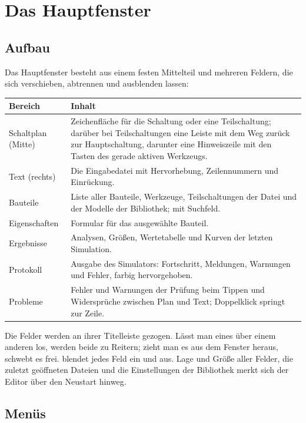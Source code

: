 \chapter{Das Hauptfenster}
\label{kap:editor-fenster}

\section{Aufbau}

Das Hauptfenster besteht aus einem festen Mittelteil und mehreren Feldern,
die sich verschieben, abtrennen und ausblenden lassen:

\begin{center}
\begin{tabularx}{\textwidth}{@{}lL@{}}
  \toprule
  Bereich & Inhalt \\
  \midrule
  Schaltplan (Mitte) & Zeichenfläche für die Schaltung oder eine
    Teilschaltung; darüber bei Teilschaltungen eine Leiste mit dem Weg
    zurück zur Hauptschaltung, darunter eine Hinweiszeile mit den Tasten des
    gerade aktiven Werkzeugs. \\
  Text (rechts) & Die Eingabedatei mit Hervorhebung, Zeilennummern und
    Einrückung. \\
  Bauteile & Liste aller Bauteile, Werkzeuge, Teilschaltungen der Datei und
    der Modelle der Bibliothek; mit Suchfeld. \\
  Eigenschaften & Formular für das ausgewählte Bauteil. \\
  Ergebnisse & Analysen, Größen, Wertetabelle und Kurven der letzten
    Simulation. \\
  Protokoll & Ausgabe des Simulators: Fortschritt, Meldungen, Warnungen und
    Fehler, farbig hervorgehoben. \\
  Probleme & Fehler und Warnungen der Prüfung beim Tippen und
    Widersprüche zwischen Plan und Text; Doppelklick springt zur Zeile. \\
  \bottomrule
\end{tabularx}
\end{center}

Die Felder werden an ihrer Titelleiste gezogen. Lässt man eines über einem
anderen los, werden beide zu Reitern; zieht man es aus dem Fenster heraus,
schwebt es frei.  blendet jedes Feld ein und aus. Lage und
Größe aller Felder, die zuletzt geöffneten Dateien und die Einstellungen der
Bibliothek merkt sich der Editor über den Neustart hinweg.

\section{Menüs}

